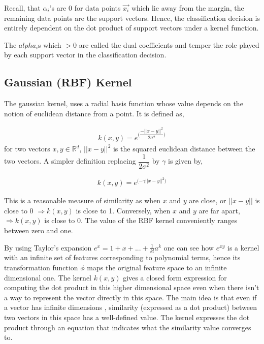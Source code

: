\documentclass[final,3p,times,twocolumn]{elsarticle}
\begin{document}
Recall, that $\alpha_{i}$'s are 0 for data points $\vec{x_{i}}$ which lie away from the margin, the remaining data points are the support vectors. Hence, the classification decision is entirely dependent on the dot product of support vectors under a kernel function.  

The $alpha_{i}$s which $> 0$ are called the dual coefficients and temper the role played by each support vector in the classification decision. 

\subsection{Gaussian (RBF) Kernel}
\label{rbf}

The gaussian kernel, uses a radial basis function whose value depends on the notion of euclidean distance from a point. It is defined as,  

\begin{gather}
k(x,y) = e^{\Big( \dfrac{-||x-y||^2}{2\sigma^2}\Big)}
\end{gather}
for two vectors $x,y \in \mathbb{R}^d$, $||x-y||^{2}$ is the squared euclidean distance between the two vectors. A simpler definition replacing $\dfrac{1}{2\sigma^2}$ by $\gamma$ is given by,

\begin{gather}
k(x,y) = e^{\textstyle \Big({-\gamma||x-y||^2}\Big)}
\label{gamma}
\end{gather}

This is a reasonable measure of similarity as when $x$ and $y$ are close, or $||x-y||$ is close to 0 $\Rightarrow k(x,y)$ is close to 1. Conversely, when $x$ and $y$ are far apart, $\Rightarrow k(x,y)$ is close to 0. The value of the RBF kernel conveniently ranges between zero and one.  

By using Taylor's expansion $e^{x} = 1 + x + ... + \frac{1}{k!}a^{k}$ one can see how $e^{xy}$ is a kernel with an infinite set of features corresponding to polynomial terms, hence its transformation function $\phi$ maps the original feature space to an infinite dimensional one. The kernel $k(x,y)$ gives a closed form expression for computing the dot product in this higher dimensional space even when there isn't a way to represent the vector directly in this space. The main idea is that even if a vector has infinite dimensions , similarity (expressed as a dot product) between two vectors in this space has a well-defined value. The kernel expresses the dot product through an equation that indicates what the similarity value converges to.  
\end{document}
